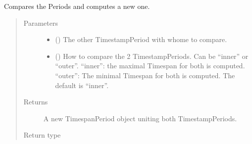 \documentclass[letterpaper,10pt,english]{sphinxmanual}
\begin{document}
\begin{fulllineitems}
\begin{fulllineitems}
\sphinxAtStartPar
Compares the Periods and computes a new one.
\begin{quote}\begin{description}
\item[{Parameters}] \leavevmode\begin{itemize}
\item {} 
\sphinxAtStartPar
{} ({\hyperref[\detokenize{weatherDB.lib:weatherDB.lib.utils.TimestampPeriod}]{}}) \textendash{} The other TimestampPeriod with whome to compare.

\item {} 
\sphinxAtStartPar
{} (\sphinxstyleliteralemphasis{\sphinxupquote{, }}) \textendash{} How to compare the 2 TimestampPeriods.
Can be “inner” or “outer”.
“inner”: the maximal Timespan for both is computed.
“outer”: The minimal Timespan for both is computed.
The default is “inner”.

\end{itemize}

\item[{Returns}] \leavevmode
\sphinxAtStartPar
A new TimespanPeriod object uniting both TimestampPeriods.

\item[{Return type}] \leavevmode
\sphinxAtStartPar
{\hyperref[\detokenize{weatherDB.lib:weatherDB.lib.utils.TimestampPeriod}]{}}

\end{description}\end{quote}

\end{fulllineitems}


\end{fulllineitems}

\end{document}
